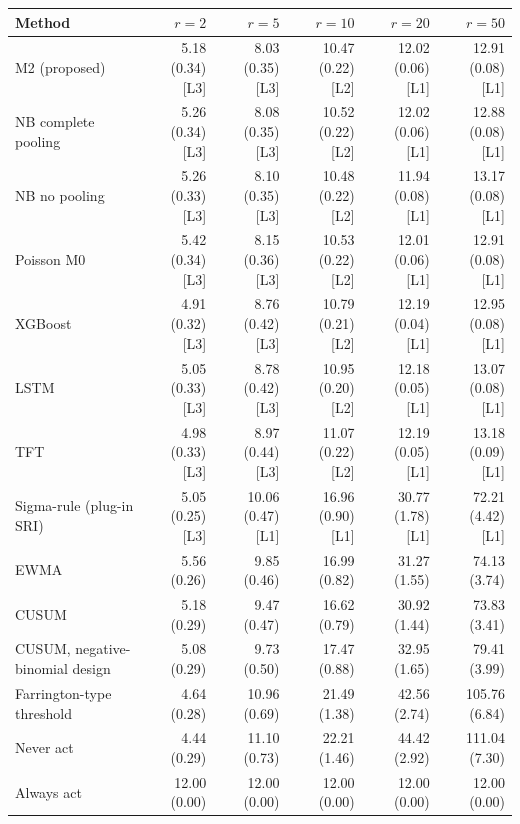 \noindent\begin{minipage}{\linewidth}
\label{tab:S19.1}
\centering\scriptsize
\begin{tabular}{lrrrrr}
\toprule
Method & $r = 2$ & $r = 5$ & $r = 10$ & $r = 20$ & $r = 50$ \\ \midrule
M2 (proposed) & 5.18 (0.34) [L3] & 8.03 (0.35) [L3] & 10.47 (0.22) [L2] & 12.02 (0.06) [L1] & 12.91 (0.08) [L1] \\
NB complete pooling & 5.26 (0.34) [L3] & 8.08 (0.35) [L3] & 10.52 (0.22) [L2] & 12.02 (0.06) [L1] & 12.88 (0.08) [L1] \\
NB no pooling & 5.26 (0.33) [L3] & 8.10 (0.35) [L3] & 10.48 (0.22) [L2] & 11.94 (0.08) [L1] & 13.17 (0.08) [L1] \\
Poisson M0 & 5.42 (0.34) [L3] & 8.15 (0.36) [L3] & 10.53 (0.22) [L2] & 12.01 (0.06) [L1] & 12.91 (0.08) [L1] \\
XGBoost & 4.91 (0.32) [L3] & 8.76 (0.42) [L3] & 10.79 (0.21) [L2] & 12.19 (0.04) [L1] & 12.95 (0.08) [L1] \\
LSTM & 5.05 (0.33) [L3] & 8.78 (0.42) [L3] & 10.95 (0.20) [L2] & 12.18 (0.05) [L1] & 13.07 (0.08) [L1] \\
TFT & 4.98 (0.33) [L3] & 8.97 (0.44) [L3] & 11.07 (0.22) [L2] & 12.19 (0.05) [L1] & 13.18 (0.09) [L1] \\
Sigma-rule (plug-in SRI) & 5.05 (0.25) [L3] & 10.06 (0.47) [L1] & 16.96 (0.90) [L1] & 30.77 (1.78) [L1] & 72.21 (4.42) [L1] \\
EWMA & 5.56 (0.26) & 9.85 (0.46) & 16.99 (0.82) & 31.27 (1.55) & 74.13 (3.74) \\
CUSUM & 5.18 (0.29) & 9.47 (0.47) & 16.62 (0.79) & 30.92 (1.44) & 73.83 (3.41) \\
CUSUM, negative-binomial design & 5.08 (0.29) & 9.73 (0.50) & 17.47 (0.88) & 32.95 (1.65) & 79.41 (3.99) \\
Farrington-type threshold & 4.64 (0.28) & 10.96 (0.69) & 21.49 (1.38) & 42.56 (2.74) & 105.76 (6.84) \\
Never act & 4.44 (0.29) & 11.10 (0.73) & 22.21 (1.46) & 44.42 (2.92) & 111.04 (7.30) \\
Always act & 12.00 (0.00) & 12.00 (0.00) & 12.00 (0.00) & 12.00 (0.00) & 12.00 (0.00) \\
\bottomrule
\end{tabular}
\end{minipage}
\vspace{14pt}


